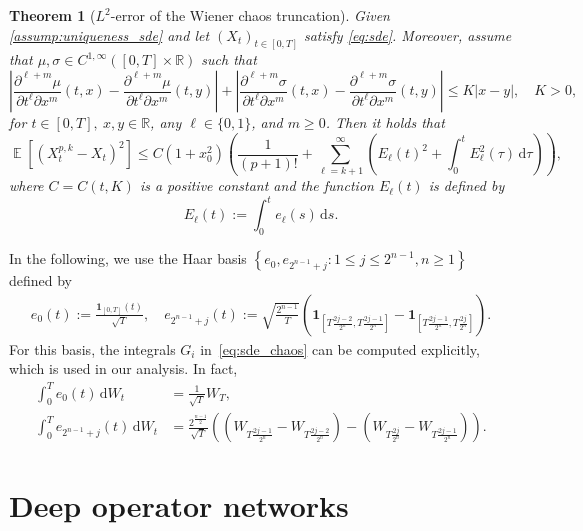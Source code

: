\documentclass[12pt]{article}
\newtheorem{theorem}{Theorem}[section]
\theoremstyle{remark}
\theoremstyle{plain}
\numberwithin{equation}{section}
\newcommand{\dd}{\ensuremath{\,\mathrm d}}
\DeclareMathOperator{\E}{\mathbb E}
\newcommand{\R}{\mathbb{R}}
\begin{document}
\begin{theorem}[{$L^2$-error of the Wiener chaos truncation}]\label{theorem:l2_error_truncation}
    Given \cref{assump:uniqueness_sde} and let $(X_t)_{t \in [0,T]}$ satisfy \cref{eq:sde}.
    Moreover, assume that $\mu,\sigma \in C^{1,\infty}([0,T]\times \R)$ such that
    \begin{equation*}
        \left|\frac{\partial^{\ell+m}\mu}{\partial t^\ell \partial x^m}(t, x) - \frac{\partial^{\ell+m}\mu}{\partial t^\ell \partial x^m}(t, y) \right| + \left|\frac{\partial^{\ell+m}\sigma}{\partial t^\ell \partial x^m}(t, x) - \frac{\partial^{\ell+m}\sigma}{\partial t^\ell \partial x^m}(t, y) \right| \leq K|x-y|,\quad K>0,
    \end{equation*}
    for $t \in [0,T],\ x,y \in \R$, any $\ell \in \{0,1\}$, and $m \geq 0$.
    Then it holds that
    \begin{equation}
        \E[(X_t^{p,k} - X_t)^2] \leq C(1+x_0^2)\left(\frac{1}{(p+1)!} + \sum_{\ell=k+1}^\infty \left(E_\ell(t)^2 + \int_0^t E_\ell^2(\tau)\dd\tau\right) \right), \label{eq:l2_error_truncation}
    \end{equation}
    where $C = C(t, K)$ is a positive constant and the function $E_\ell(t)$ is defined by
    \begin{equation}
        E_\ell(t) := \int_0^t e_\ell(s)\dd s. \label{eq:int_basis}
    \end{equation}
\end{theorem}
%
In the following, we use the Haar basis $\left\{e_0, e_{2^{n-1}+j} : 1 \leq j \leq 2^{n-1}, n \geq 1\right\}$ defined by
\begin{align*}
    e_0(t) := \frac{\mathbf 1_{[0, T]}(t)}{\sqrt T},\quad
    e_{2^{n-1}+j}(t) := \sqrt{\frac{2^{n-1}}{T}}\left(\mathbf 1_{\left[T\frac{2j-2}{2^n}, T\frac{2j-1}{2^n}\right]}-\mathbf 1_{\left[T\frac{2j-1}{2^n}, T\frac{2j}{2^n}\right]}\right).
\end{align*}
For this basis, the integrals $G_i$ in~\cref{eq:sde_chaos} can be computed explicitly, which is used in our analysis.
In fact,
\begin{align*}
    \int_0^T e_0(t) \dd W_t &= \frac{1}{\sqrt T} W_T,\\
    \int_0^T e_{2^{n-1}+j}(t) \dd W_t &= \frac{2^{\frac{n-1}{2}}}{\sqrt T} \left(\left(W_{T\frac{2j-1}{2^n}} - W_{T\frac{2j-2}{2^n}}\right) - \left(W_{T\frac{2j}{2^n}} - W_{T\frac{2j-1}{2^n}}\right)\right).
\end{align*}
\section{Deep operator networks}
\label{sec:DON}
\end{document}
